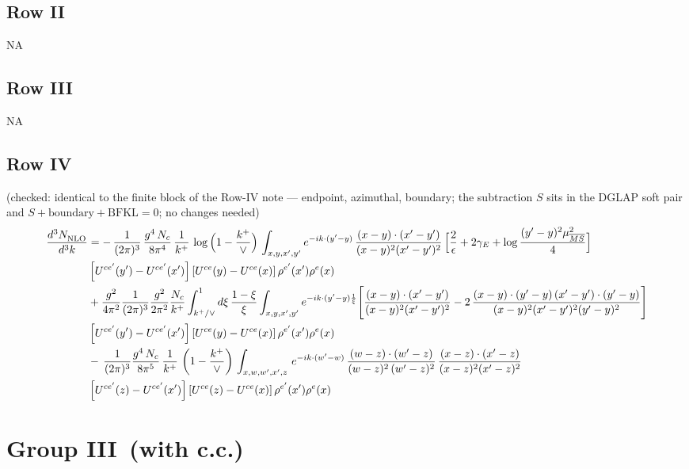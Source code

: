 \documentclass[9pt]{article}
\numberwithin{equation}{section}
\begin{document}
\subsection{Row II}
\textsc{NA}
\subsection{Row III}
\textsc{NA}
\subsection{Row IV}
{\color{red}(checked: identical to the finite block of the Row-IV note --- endpoint,
azimuthal, boundary; the subtraction $S$ sits in the DGLAP soft pair and
$S+\text{boundary}+\text{BFKL}=0$; no changes needed)}
\begin{align}
\frac{d^{3}N_{\rm NLO}^{\rm}}{d^{3}k}  & =  
-\,\frac{1}{(2\pi)^{3}}\,\frac{g^{4}\,N_{c}}{8\pi^{4}}\,\frac{1}{k^{+}}\,\log\Big(1-\frac{k^{+}}{\vee}\Big)\,\int_{x,y,x',y'}e^{-ik\cdot(y'-y)}\,\frac{(x-y)\cdot(x'-y')}{(x-y)^{2}(x'-y')^{2}}\,\Big[\frac{2}{\epsilon}+2\gamma_{E}+\log\frac{(y'-y)^{2}\mu^{2}_{\overline{MS}}}{4}\Big]\notag \\ & \left[U^{ce'}(y')-U^{ce'}(x')\right]\left[U^{ce}(y)-U^{ce}(x)\right]\rho^{e'}(x')\rho^{e}(x)\notag\\
&+\frac{g^{2}}{4\pi^{2}}\frac{1}{(2\pi)^{3}}\frac{g^{2}}{2\pi^{2}}\frac{N_{c}}{k^{+}}\int_{k^{+}/\vee}^{1}d\xi\,\frac{1-\xi}{\xi}\int_{x,y,x',y'}e^{-ik\cdot(y'-y)\frac{1}{\xi}}\Bigg[\frac{(x-y)\cdot(x'-y')}{(x-y)^{2}(x'-y')^{2}}-2\,\frac{(x-y)\cdot(y'-y)\,(x'-y')\cdot(y'-y)}{(x-y)^{2}(x'-y')^{2}(y'-y)^{2}}\Bigg]\notag \\ & \left[U^{ce'}(y')-U^{ce'}(x')\right]\left[U^{ce}(y)-U^{ce}(x)\right]\rho^{e'}(x')\rho^{e}(x)\notag \\ & -\,\frac{1}{(2\pi)^{3}}\frac{g^{4}\,N_{c}}{8\pi^{5}}\,\frac{1}{k^{+}}\, \left(1-\frac{k^{+}}{\vee}\right)\,\int_{x,w,w',x',z}\,e^{-ik\cdot(w'-w)}\,\frac{(w-z)\cdot (w'-z)}{(w-z)^{2}\, (w'-z)^{2}}\,\frac{(x-z)\cdot(x'-z)}{(x-z)^{2}(x'-z)^{2}}\notag \\ & \left[U^{ce'}(z)-U^{ce'}(x')\right]\left[U^{ce}(z)-U^{ce}(x)\right]\rho^{e'}(x')\rho^{e}(x)
\end{align}
\section{Group III\, (with c.c.)}
\end{document}

